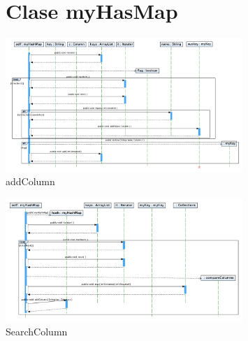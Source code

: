 \documentclass[letterpaper,12pt]{report}
\begin{document}
\begin{figure}
\section{Clase myHasMap}
\centering
\includegraphics[angle=90, width=0.8\textwidth]{myHasMap/addColumn.png}
\caption{addColumn}
\end{figure}
\newpage
\begin{figure}
\centering
\includegraphics[angle=90, width=0.8\textwidth]{myHasMap/SearchColumn.png}
\caption{SearchColumn}
\end{figure}
\newpage


\end{document}
